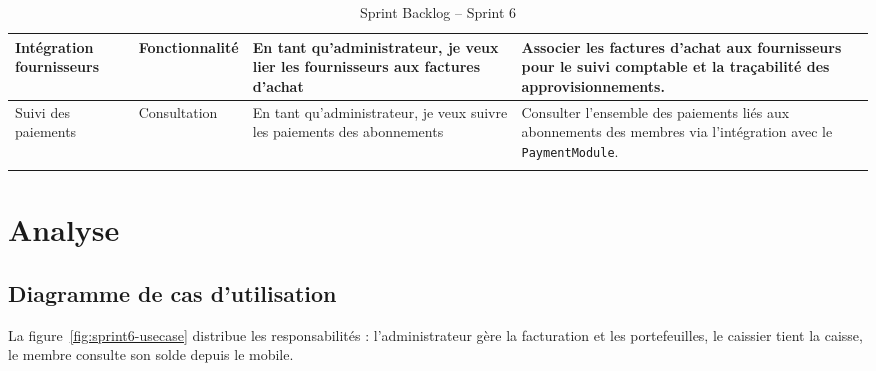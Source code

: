 ﻿\documentclass[../main.tex]{subfiles}
\begin{document}
\begin{longtable}{|p{2.5cm}|p{2cm}|p{4cm}|p{5.5cm}|}
\multirow{1}{*}{\parbox{2.5cm}{Int\'{e}gration fournisseurs}} & Fonctionnalit\'{e} & En tant qu'administrateur, je veux lier les fournisseurs aux factures d'achat & Associer les factures d'achat aux fournisseurs pour le suivi comptable et la tra\c{c}abilit\'{e} des approvisionnements. \\
\hline

\multirow{1}{*}{\parbox{2.5cm}{Suivi des paiements}} & Consultation & En tant qu'administrateur, je veux suivre les paiements des abonnements & Consulter l'ensemble des paiements li\'{e}s aux abonnements des membres via l'int\'{e}gration avec le \texttt{PaymentModule}. \\
\hline
\caption{Sprint Backlog -- Sprint 6}
\label{tab:backlog_sprint6}
\end{longtable}

\section{Analyse}

\subsection{Diagramme de cas d'utilisation}

La figure~\ref{fig:sprint6-usecase} distribue les responsabilit\'{e}s : l'administrateur g\`{e}re la facturation et les portefeuilles, le caissier tient la caisse, le membre consulte son solde depuis le mobile.
\end{document}
